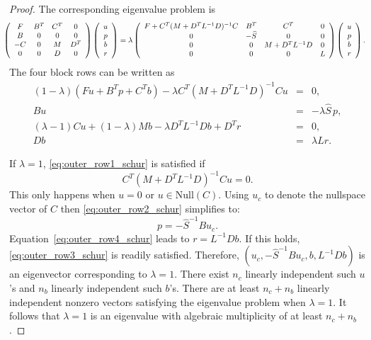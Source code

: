 \documentclass{article}
\begin{document}
\begin{proof}
The corresponding eigenvalue problem is
 \begin{equation*}
 \hspace{-3mm}   %
\left(
\begin{array}{cccc}
F & B^T & C^T & 0\\
B & 0 & 0& 0\\
-C & 0& M & D^T\\
0 & 0 & D & 0
\end{array}
\right)
\left(
\begin{array}{c}
u\\
p\\
b\\
r
\end{array}
\right)
=
\lambda 
\left(
\begin{array}{cccc}
  F + C^T ( M + D^T L^{-1} D)^{-1} C  & B^T & C^T & 0\\
0 & -\widehat{S} & 0 & 0 \\
0 & 0 & M + D^T L^{-1} D & 0\\
0 & 0 & 0 & L
\end{array}
\right)
\left(
\begin{array}{c}
u\\
p\\
b\\
r
\end{array}
\right).
\end{equation*}
The four block rows can be written as
\begin{eqnarray}
    \label{eq:outer_row1_schur} (1-\lambda) (Fu + B^T p+ C^T b) - \lambda C^T(M+D^TL^{-1} D)^{-1}Cu   &=& 0,\\
    \label{eq:outer_row2_schur} B u &=& -\lambda \widehat{S}\, p,\\
    \label{eq:outer_row3_schur} (\lambda -1) C u + (1 - \lambda) M b - \lambda D^T L^{-1} D b + D^T r &=& 0,\\
    \label{eq:outer_row4_schur} D b &=& \lambda L r.
\end{eqnarray}

If $\lambda = 1$, \eqref{eq:outer_row1_schur} is satisfied if
$$C^T(M+D^TL^{-1} D)^{-1}Cu = 0.$$ This only happens when $u = 0$ or $u \in
\mbox{Null}(C)$. Using $u_c$ to denote the nullspace vector of $C$ then \eqref{eq:outer_row2_schur} simplifies to:
$$p = -\widehat{S}^{-1}B u_c.$$
Equation~\eqref{eq:outer_row4_schur} leads to $r = L^{-1} D b.$
If this holds, \eqref{eq:outer_row3_schur} is readily satisfied.
Therefore, $(u_c, -\widehat{S}^{-1} B u_c, b, L^{-1} D b)$ is an eigenvector corresponding to $\lambda=1$. There exist $n_c$ linearly independent such $u$'s and $n_b$ linearly independent such $b$'s. There are at least $n_c+n_b$ linearly independent nonzero vectors satisfying the eigenvalue problem when $\lambda = 1$. It follows that $\lambda = 1$ is an eigenvalue with algebraic multiplicity of at least $n_c + n_b$.


\end{proof}
\end{document}
